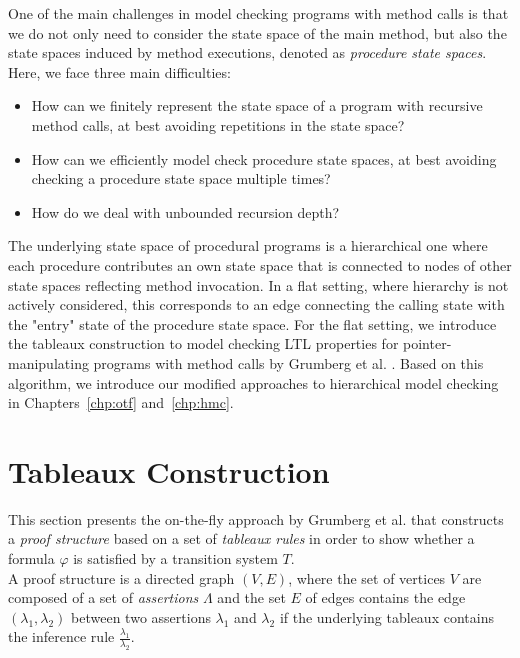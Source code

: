 \documentclass[a4paper, 12pt, twoside]{report}
\begin{document}
	One of the main challenges in model checking programs with method calls is that we do not only need to consider the state space of the main method, but also the state spaces induced by method executions, denoted as \textit{procedure state spaces}. Here, we face three main difficulties:
	\begin{itemize}
		\item How can we finitely represent the state space of a program with recursive method calls, at best avoiding repetitions in the state space?
		\item How can we efficiently model check procedure state spaces, at best avoiding checking a procedure state space multiple times? 
		\item How do we deal with unbounded recursion depth?
	\end{itemize}
	
	The underlying state space of procedural programs is a hierarchical one where each procedure contributes an own state space that is connected to nodes of other state spaces reflecting method invocation. In a flat setting, where hierarchy is not actively considered, this corresponds to an edge connecting the calling state with the "entry" state of the procedure state space. For the flat setting, we introduce the tableaux construction to model checking LTL properties for pointer-manipulating programs with method calls by Grumberg et al. \cite{bhat1995efficient}. Based on this algorithm, we introduce our modified approaches to hierarchical model checking in Chapters~\ref{chp:otf} and~\ref{chp:hmc}.
	
	\section{Tableaux Construction}\label{sec:tableaux}
	
	This section presents the on-the-fly approach by Grumberg et al. \cite{bhat1995efficient} that constructs a \textit{proof structure} based on a set of \textit{tableaux rules} in order to show whether a formula $\varphi$ is satisfied by a transition system $T$. \\
	
	A proof structure is a directed graph $(V,E)$, where the set of vertices $V$ are composed of a set of \textit{assertions} $\Lambda$ and the set $E$ of edges contains the edge $(\lambda_1, \lambda_2)$ between two assertions $\lambda_1$ and $\lambda_2$ if the underlying tableaux contains the inference rule $\frac{\lambda_1}{\lambda_2}$.
	
\end{document}
